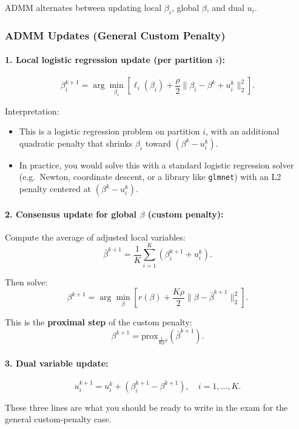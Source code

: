 \documentclass[11pt]{article}
\begin{document}
ADMM alternates between updating local $\beta_i$, global $\beta$, and dual $u_i$.

\subsubsection*{ADMM Updates (General Custom Penalty)}

\paragraph{1. Local logistic regression update (per partition $i$):}
\[
    \beta_i^{k+1}
    = \arg\min_{\beta_i}
    \left[
        \ell_i(\beta_i)
        + \frac{\rho}{2} \|\beta_i - \beta^k + u_i^k\|_2^2
    \right].
\]

Interpretation:
\begin{itemize}
    \item This is a logistic regression problem on partition $i$, with an additional quadratic penalty that shrinks $\beta_i$ toward $(\beta^k - u_i^k)$.
    \item In practice, you would solve this with a standard logistic regression solver (e.g.\ Newton, coordinate descent, or a library like \texttt{glmnet}) with an L2 penalty centered at $(\beta^k - u_i^k)$.
\end{itemize}

\paragraph{2. Consensus update for global $\beta$ (custom penalty):}

Compute the average of adjusted local variables:
\[
    \bar{\beta}^{k+1}
    = \frac{1}{K} \sum_{i=1}^K \left(\beta_i^{k+1} + u_i^k\right).
\]

Then solve:
\[
    \beta^{k+1}
    = \arg\min_\beta \left[
        r(\beta) + \frac{K \rho}{2} \|\beta - \bar{\beta}^{k+1}\|_2^2
    \right].
\]

This is the \textbf{proximal step} of the custom penalty:
\[
    \beta^{k+1} = \text{prox}_{\frac{1}{K\rho} r}(\bar{\beta}^{k+1}).
\]

\paragraph{3. Dual variable update:}
\[
    u_i^{k+1}
    = u_i^k + \left(\beta_i^{k+1} - \beta^{k+1}\right),
    \quad i = 1,\dots,K.
\]

These three lines are what you should be ready to write in the exam for the general custom-penalty case.
\end{document}
